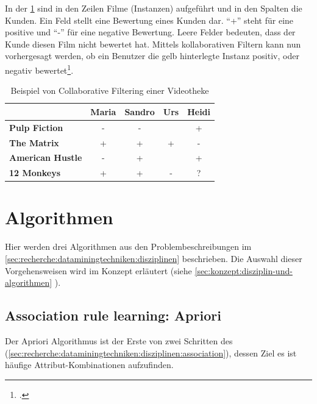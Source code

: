 In der \cref{fig:recherche:dataminingtechniken:disziplinen:collaborativefiltering} sind in den Zeilen Filme (Instanzen) aufgeführt und in den Spalten die Kunden. Ein Feld stellt eine Bewertung eines Kunden dar. "`+"' steht für eine positive und "`-"' für eine negative Bewertung. Leere Felder bedeuten, dass der Kunde diesen Film nicht bewertet hat. Mittels kollaborativen Filtern kann nun vorhergesagt werden, ob ein Benutzer die gelb hinterlegte Instanz positiv, oder negativ bewertet\footcite{collaborative_filtering}.
\begin{table}[H] 
	\caption{Beispiel von Collaborative Filtering einer Videotheke}
	\centering
	\label{fig:recherche:dataminingtechniken:disziplinen:collaborativefiltering}
	
	\begin{tabular}{ | l | c | c | c | c |} 
		\hline 
		\rowcolor{tableheadcolor}
		\bfseries & 
		\bfseries Maria & 
		\bfseries Sandro & 
		\bfseries Urs & 
		\bfseries Heidi \\ \hline 
		\textbf{Pulp Fiction} & - & - &  & + \\ \hline 
		\textbf{The Matrix} & + & + & + & - \\ \hline 
		\textbf{American Hustle} & - & + &  & + \\ \hline 
		\textbf{12 Monkeys} & + & + & - & \cellcolor{yellow!75}? \\ \hline 
	\end{tabular} 
\end{table}

\section{Algorithmen}
\label{sec:recherche:algorithmen}
Hier werden drei Algorithmen aus den Problembeschreibungen im \cref{sec:recherche:dataminingtechniken:disziplinen}  beschrieben. Die Auswahl dieser Vorgehensweisen wird im Konzept erläutert (siehe \cref{sec:konzept:disziplin-und-algorithmen} ).

\subsection{Association rule learning: Apriori}
\label{sec:recherche:apriori}
Der Apriori Algorithmus ist der Erste von zwei Schritten des  (\cref{sec:recherche:dataminingtechniken:disziplinen:association}), dessen Ziel es ist häufige Attribut-Kombinationen aufzufinden. 

